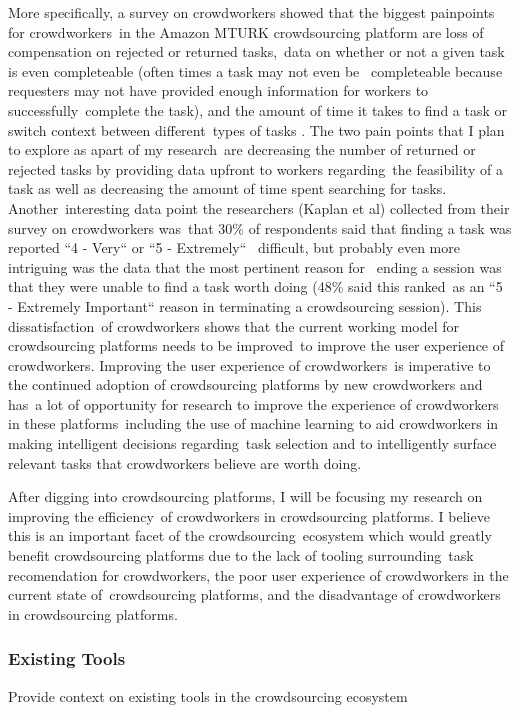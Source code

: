 \documentclass[letterpaper,12pt]{article}
\begin{document}
More specifically, a survey on crowdworkers showed that the biggest painpoints for crowdworkers\
in the Amazon MTURK crowdsourcing platform are loss of compensation on rejected or returned tasks,\
data on whether or not a given task is even completeable (often times a task may not even be \
completeable because requesters may not have provided enough information for workers to successfully\
complete the task), and the amount of time it takes to find a task or switch context between different\
types of tasks \cite{Kaplan2018}. The two pain points that I plan to explore as apart of my research\
are decreasing the number of returned or rejected tasks by providing data upfront to workers regarding\
the feasibility of a task as well as decreasing the amount of time spent searching for tasks. Another\
interesting data point the researchers (Kaplan et al) collected from their survey on crowdworkers was\
that 30\% of respondents said that finding a task was reported ``4 - Very`` or ``5 - Extremely`` \
difficult, but probably even more intriguing was the data that the most pertinent reason for \
ending a session was that they were unable to find a task worth doing (48\% said this ranked\
as an ``5 - Extremely Important`` reason in terminating a crowdsourcing session). \cite{Kaplan2018} This dissatisfaction\
of crowdworkers shows that the current working model for crowdsourcing platforms needs to be improved\
to improve the user experience of crowdworkers. Improving the user experience of crowdworkers\
is imperative to the continued adoption of crowdsourcing platforms by new crowdworkers and has\
a lot of opportunity for research to improve the experience of crowdworkers in these platforms\
including the use of machine learning to aid crowdworkers in making intelligent decisions regarding\
task selection and to intelligently surface relevant tasks that crowdworkers believe are worth doing.

After digging into crowdsourcing platforms, I will be focusing my research on improving the efficiency\
of crowdworkers in crowdsourcing platforms. I believe this is an important facet of the crowdsourcing\
ecosystem which would greatly benefit crowdsourcing platforms due to the lack of tooling surrounding\
task recomendation for crowdworkers, the poor user experience of crowdworkers in the current state of\
crowdsourcing platforms, and the disadvantage of crowdworkers in crowdsourcing platforms.

\subsubsection{Existing Tools}
Provide context on existing tools in the crowdsourcing ecosystem
\end{document}
